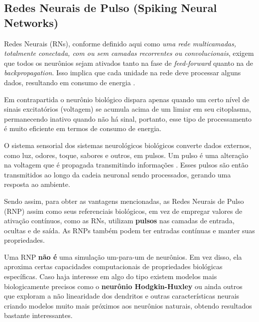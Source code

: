 		\subsection{Redes Neurais de Pulso (Spiking Neural Networks)}
			
			\par Redes Neurais (RNs), conforme definido aqui como \textit{uma rede multicamadas, totalmente conectada, com ou sem camadas recorrentes ou convolucionais}, exigem que todos os neurônios sejam ativados tanto na fase de \textit{feed-forward} quanto na de \textit{backpropagation}. Isso implica que cada unidade na rede deve processar alguns dados, resultando em consumo de energia \cite{10242251}.
			
			\par Em contrapartida o neurônio biológico dispara apenas quando um certo nível de sinais excitatórios (voltagem) se acumula acima de um limiar em seu citoplasma, permanecendo inativo quando não há sinal, portanto, esse tipo de processamento é muito eficiente em termos de consumo de energia.

			\par O sistema sensorial dos sistemas neurológicos biológicos converte dados externos, como luz, odores, toque, sabores e outros, em pulsos. Um pulso é uma alteração na voltagem que é propagada transmitindo informações \cite{kasabov2019time}. Esses pulsos são então transmitidos ao longo da cadeia neuronal sendo processados, gerando uma resposta ao ambiente.
			
			\par Sendo assim, para obter as vantagens mencionadas, as Redes Neurais de Pulso (RNP) assim como seus referenciais biológicos, em vez de empregar valores de ativação contínuos, como as RNs, utilizam \textbf{pulsos} nas camadas de entrada, ocultas e de saída. As RNPs também podem ter entradas contínuas e manter suas propriedades.
			
			\par Uma RNP \textbf{não é} uma simulação um-para-um de neurônios. Em vez disso, ela aproxima certas capacidades computacionais de propriedades biológicas específicas. Caso haja interesse em algo do tipo existem modelos mais biologicamente precisos como o \textbf{neurônio Hodgkin-Huxley} \cite{gerstner2014neuronal} ou ainda outros que exploram a não linearidade dos dendritos e outras características neurais \cite{jones2020single} criando modelos muito mais próximos aos neurônios naturais, obtendo resultados bastante interessantes.
			
